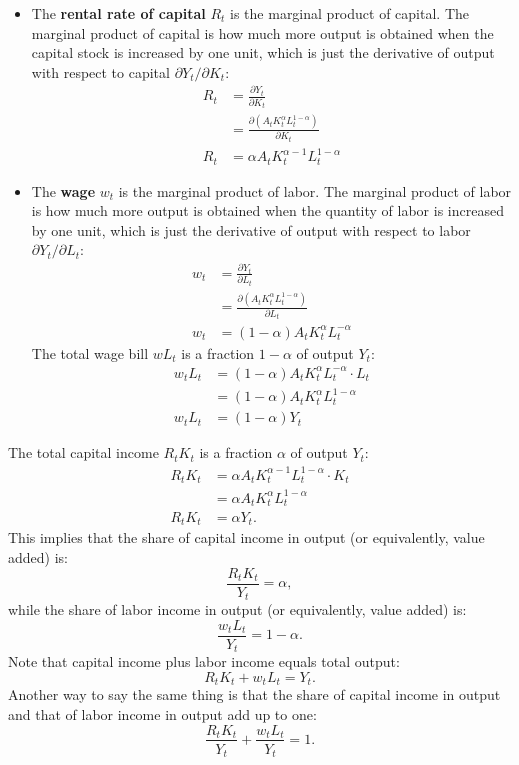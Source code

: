 \documentclass[]{book}
\providecommand{\tightlist}{%
  \setlength{\itemsep}{0pt}\setlength{\parskip}{0pt}}
\theoremstyle{definition}
\theoremstyle{definition}
\theoremstyle{definition}
\theoremstyle{remark}
\begin{document}
\begin{itemize}
\tightlist
\item
  The \textbf{rental rate of capital} \(R_t\) is the marginal product of
  capital. The marginal product of capital is how much more output is
  obtained when the capital stock is increased by one unit, which is
  just the derivative of output with respect to capital
  \(\partial Y_t / \partial K_t\): \[
  \begin{aligned}
  R_t&=\frac{\partial Y_t}{\partial K_t}\\
  &= \frac{\partial \left(A_t K_t^{\alpha} L_t^{1-\alpha}\right)}{\partial K_t}\\
  R_t &= \alpha A_t K_t^{\alpha-1} L_t^{1-\alpha}
  \end{aligned}
  \]
\item
  The \textbf{wage} \(w_t\) is the marginal product of labor. The
  marginal product of labor is how much more output is obtained when the
  quantity of labor is increased by one unit, which is just the
  derivative of output with respect to labor
  \(\partial Y_t / \partial L_t\): \[
  \begin{aligned}
  w_t &=\frac{\partial Y_t}{\partial L_t}\\
  &= \frac{\partial \left(A_t K_t^{\alpha} L_t^{1-\alpha}\right)}{\partial L_t}\\
  w_t &= (1-\alpha) A_t K_t^{\alpha} L_t^{-\alpha}
  \end{aligned}
  \] The total wage bill \(w L_t\) is a fraction \(1-\alpha\) of output
  \(Y_t\): \[
  \begin{aligned}
  w_t L_t &= (1-\alpha) A_t K_t^{\alpha} L_t^{-\alpha} \cdot L_t \\
  &= (1-\alpha) A_t K_t^{\alpha} L_t^{1-\alpha}\\
  w_t L_t &= (1-\alpha) Y_t
  \end{aligned}
  \]
\end{itemize}

The total capital income \(R_t K_t\) is a fraction \(\alpha\) of output
\(Y_t\): \[
\begin{aligned}
R_t K_t &= \alpha A_t K_t^{\alpha-1} L_t^{1-\alpha} \cdot K_t \\
&= \alpha A_t K_t^{\alpha} L_t^{1-\alpha}\\
R_t K_t &= \alpha Y_t.
\end{aligned}
\] This implies that the share of capital income in output (or
equivalently, value added) is: \[\frac{R_t K_t}{Y_t}=\alpha,\] while the
share of labor income in output (or equivalently, value added) is:
\[\frac{w_t L_t}{Y_t}=1-\alpha.\] Note that capital income plus labor
income equals total output: \[R_t K_t + w_t L_t = Y_t.\] Another way to
say the same thing is that the share of capital income in output and
that of labor income in output add up to one:
\[\boxed{\frac{R_t K_t}{Y_t} + \frac{w_t L_t}{Y_t}=1}.\]
\end{document}
